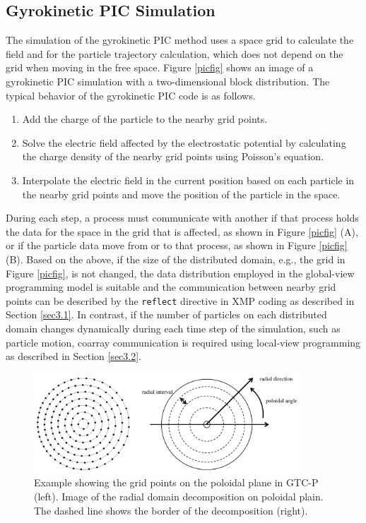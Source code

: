\subsection{Gyrokinetic PIC Simulation}
The simulation of the gyrokinetic PIC method uses a space grid to calculate the field and for the particle trajectory calculation, which does not depend on the grid when moving in the free space. Figure \ref{picfig} shows an image of a gyrokinetic PIC simulation with a two-dimensional block distribution. The typical behavior of the gyrokinetic PIC code is as follows.

\begin{enumerate}
\item Add the charge of the particle to the nearby grid points.
\item Solve the electric field affected by the electrostatic potential by calculating the charge density of the nearby grid points using Poisson's equation.
\item Interpolate the electric field in the current position based on each particle in the nearby grid points and move the position of the particle in the space.
\end{enumerate}

During each step, a process must communicate with another if that process holds the data for the space in the grid that is affected, as shown in Figure \ref{picfig} (A), or if the particle data move from or to that process, as shown in Figure \ref{picfig} (B). Based on the above, if the size of the distributed domain, e.g., the grid in Figure \ref{picfig}, is not changed, the data distribution employed in the global-view programming model is suitable and the communication between nearby grid points can be described by the {\tt reflect} directive in XMP coding as described in Section \ref{sec3.1}. In contrast, if the number of particles on each distributed domain changes dynamically during each time step of the simulation, such as particle motion, coarray communication is required using local-view programming as described in Section \ref{sec3.2}.

\begin{figure}[t]
\begin{center}
\includegraphics[width=10cm,bb=0 0 585 218]{./figure/poloidal.pdf}
\caption{Example showing the grid points on the poloidal plane in GTC-P\cite{POLOIDAL} (left). Image of the radial domain decomposition on poloidal plain. The dashed line shows the border of the decomposition (right).}
\label{poloidal}
\end{center}
\end{figure}



